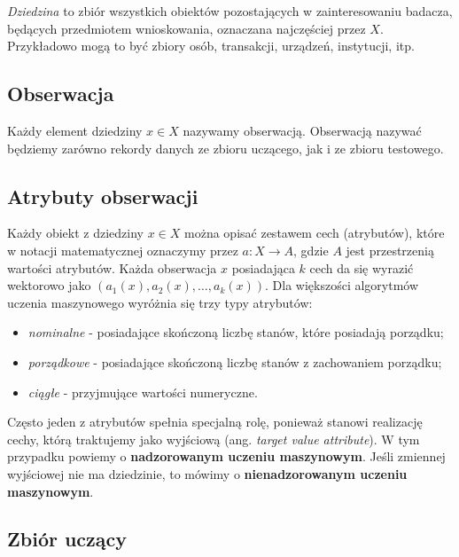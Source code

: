 \documentclass[]{book}
\providecommand{\tightlist}{%
  \setlength{\itemsep}{0pt}\setlength{\parskip}{0pt}}
\theoremstyle{plain}
\theoremstyle{definition}
\begin{document}
\emph{Dziedzina} to zbiór wszystkich obiektów pozostających w zainteresowaniu badacza, będących przedmiotem wnioskowania, oznaczana najczęściej przez \(X\). Przykładowo mogą to być zbiory osób, transakcji, urządzeń, instytucji, itp.

\hypertarget{obserwacja}{%
\subsection{Obserwacja}\label{obserwacja}}

Każdy element dziedziny \(x\in X\) nazywamy obserwacją. Obserwacją nazywać będziemy zarówno rekordy danych ze zbioru uczącego, jak i ze zbioru testowego.

\hypertarget{atrybuty-obserwacji}{%
\subsection{Atrybuty obserwacji}\label{atrybuty-obserwacji}}

Każdy obiekt z dziedziny \(x\in X\) można opisać zestawem cech (atrybutów), które w notacji matematycznej oznaczymy przez \(a:X\to A\), gdzie \(A\) jest przestrzenią wartości atrybutów. Każda obserwacja \(x\) posiadająca \(k\) cech da się wyrazić wektorowo jako \((a_1(x), a_2(x), \ldots, a_k(x))\). Dla większości algorytmów uczenia maszynowego wyróżnia się trzy typy atrybutów:

\begin{itemize}
\tightlist
\item
  \emph{nominalne} - posiadające skończoną liczbę stanów, które posiadają porządku;
\item
  \emph{porządkowe} - posiadające skończoną liczbę stanów z zachowaniem porządku;
\item
  \emph{ciągłe} - przyjmujące wartości numeryczne.
\end{itemize}

Często jeden z atrybutów spełnia specjalną rolę, ponieważ stanowi realizację cechy, którą traktujemy jako wyjściową (ang. \emph{target value attribute}). W tym przypadku powiemy o \textbf{nadzorowanym uczeniu maszynowym}. Jeśli zmiennej wyjściowej nie ma dziedzinie, to mówimy o \textbf{nienadzorowanym uczeniu maszynowym}.

\hypertarget{zbior-uczacy}{%
\subsection{Zbiór uczący}\label{zbior-uczacy}}
\end{document}
